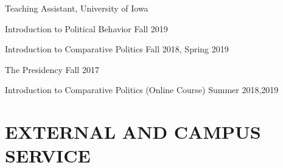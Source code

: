 \documentclass[10.5pt,]{article}
\providecommand{\tightlist}{%
	\setlength{\itemsep}{0pt}\setlength{\parskip}{0pt}}
\renewenvironment{itemize}{
	\begin{list}{}{
			\setlength{\leftmargin}{1.5em}
		}
	}{
	\end{list}
}
\begin{document}
\begin{itemize}
  \begin{itemize}
  \tightlist
  \item
    Teaching Assistant, University of Iowa

    \begin{itemize}
    \tightlist
    \item
      Introduction to Political Behavior \hfill Fall 2019
    \item
      Introduction to Comparative Politics \hfill Fall 2018, Spring 2019
    \item
      The Presidency \hfill Fall 2017
    \item
      Introduction to Comparative Politics (Online Course) \hfill Summer
      2018,2019
    \end{itemize}
  \end{itemize}
\end{itemize}

\section{EXTERNAL AND CAMPUS SERVICE}\label{external-and-campus-service}
\end{document}
